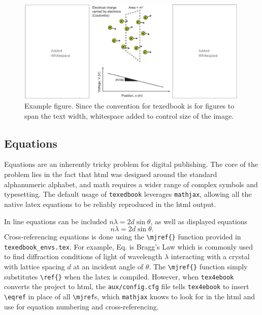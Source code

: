 \documentclass{article}
\begin{document}
\begin{figure}[t]
    \centering
    \includegraphics[width=0.99\textwidth, keepaspectratio]{figures/fig.pdf}
    \caption{Example figure. Since the convention for texedbook is for figures to span the text width, whitespace added to control size of the image.}
    \label{fig:example}
\end{figure}



\subsection{Equations} \label{sec:equations}
Equations are an inherently tricky problem for digital publishing. The core of the problem lies in the fact that html was designed around the standard alphanumeric alphabet, and math requires a wider range of complex symbols and typesetting. The default usage of \verb'texedbook' leverages \verb'mathjax', allowing all the native latex equations to be reliably reproduced in the html output.

In line equations can be included $n\lambda=2d \sin \theta$, as well as displayed equations 
\begin{equation}
    n\lambda=2d \sin \theta.
    \label{eq:braggslaw}
\end{equation}
Cross-referencing equations is done using the \verb'\mjref{}' function provided in \verb'texedbook_envs.tex'. For example, Eq.  is Bragg's Law which is commonly used to find diffraction conditions of light of wavelength $\lambda$ interacting with a crystal with lattice spacing $d$ at an incident angle of $\theta$. The \verb'\mjref{}' function simply substitutes \verb'\ref{}' when the latex is compiled. However, when \verb'tex4ebook' converts the project to html, the \verb'aux/config.cfg' file tells \verb'tex4ebook' to insert \verb'\eqref' in place of all \verb'\mjref's, which \verb'mathjax' knows to look for in the html and use for equation numbering and cross-referencing. 
\end{document}
